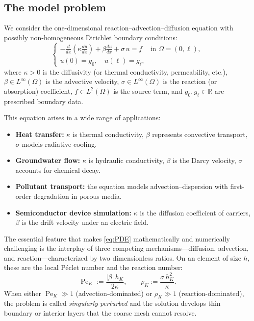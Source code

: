 \documentclass[11pt]{article}
\newcommand{\R}{\mathbb{R}}
\newcommand{\dom}{\Omega}
\newcommand{\Pe}{\operatorname{Pe}}
\theoremstyle{remark}
\begin{document}
\subsection{The model problem}

We consider the one-dimensional reaction--advection--diffusion equation with possibly non-homogeneous Dirichlet boundary conditions:
\begin{equation}\label{eq:PDE}
\begin{cases}
\displaystyle -\frac{d}{dx}\!\left(\kappa\frac{du}{dx}\right) + \beta\frac{du}{dx} + \sigma\,u = f & \text{in } \dom = (0,\ell),\\[4pt]
u(0) = g_0,\quad u(\ell) = g_\ell,
\end{cases}
\end{equation}
where $\kappa > 0$ is the diffusivity (or thermal conductivity, permeability, etc.), $\beta \in L^\infty(\dom)$ is the advective velocity, $\sigma \in L^\infty(\dom)$ is the reaction (or absorption) coefficient, $f \in L^2(\dom)$ is the source term, and $g_0, g_\ell \in \R$ are prescribed boundary data.

This equation arises in a wide range of applications:
\begin{itemize}[nosep]
    \item \textbf{Heat transfer:} $\kappa$ is thermal conductivity, $\beta$ represents convective transport, $\sigma$ models radiative cooling.
    \item \textbf{Groundwater flow:} $\kappa$ is hydraulic conductivity, $\beta$ is the Darcy velocity, $\sigma$ accounts for chemical decay.
    \item \textbf{Pollutant transport:} the equation models advection--dispersion with first-order degradation in porous media.
    \item \textbf{Semiconductor device simulation:} $\kappa$ is the diffusion coefficient of carriers, $\beta$ is the drift velocity under an electric field.
\end{itemize}

The essential feature that makes \eqref{eq:PDE} mathematically and numerically challenging is the interplay of three competing mechanisms---diffusion, advection, and reaction---characterized by two dimensionless ratios. On an element of size $h$, these are the local P\'{e}clet number and the reaction number:
\begin{equation}\label{eq:dimensionless}
\Pe_K := \frac{|\beta|\,h_K}{2\kappa}, \qquad \rho_K := \frac{\sigma\,h_K^2}{\kappa}.
\end{equation}
When either $\Pe_K \gg 1$ (advection-dominated) or $\rho_K \gg 1$ (reaction-dominated), the problem is called \emph{singularly perturbed} and the solution develops thin boundary or interior layers that the coarse mesh cannot resolve.
\end{document}
